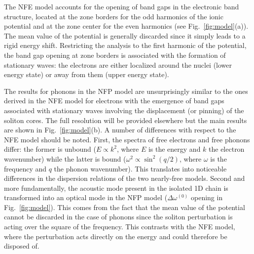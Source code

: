 \documentclass[prl,preprint]{revtex4}
\begin{document}
The \gls{NFE} model accounts for the opening of band gaps in the electronic band structure, located at the zone borders for the odd harmonics of the ionic potential and at the zone center for the even harmonics (see Fig.~\ref{fig:model}(a)). The mean value of the potential is generally discarded since it simply leads to a rigid energy shift. Restricting the analysis to the first harmonic of the potential, the band gap opening at zone borders is associated with the formation of stationary waves: the electrons are either localized around the nuclei (lower energy state) or away from them (upper energy state).

The results for phonons in the \gls{NFP} model are unsurprisingly similar to the ones derived in the \gls{NFE} model for electrons with the emergence of band gaps associated with stationary waves involving the displacement (or pinning) of the soliton cores. The full resolution will be provided elsewhere but the main results are shown in Fig.~\ref{fig:model}(b). A number of differences with respect to the \gls{NFE} model should be noted. First, the spectra of free electrons and free phonons differ: the former is unbound ($E\propto k^2$, where $E$ is the energy and $k$ the electron wavenumber) while the latter is bound ($\omega^2 \propto \sin^2{(q/2)}$, where $\omega$ is the frequency and $q$ the phonon wavenumber). This translates into noticeable differences in the dispersion relations of the two nearly-free models. Second and more fundamentally, the acoustic mode present in the isolated 1D chain is transformed into an optical mode in the NFP model ($\Delta \omega^{(0)}$ opening in Fig.~\ref{fig:model}). This comes from the fact that the mean value of the potential cannot be discarded in the case of phonons since the soliton perturbation is acting over the square of the frequency. This contrasts with the NFE model, where the perturbation acts directly on the energy and could therefore be disposed of. 
\end{document}

